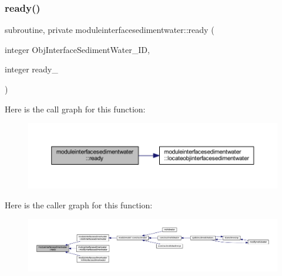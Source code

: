 \subsubsection{\texorpdfstring{ready()}{ready()}}
{\footnotesize\ttfamily subroutine, private moduleinterfacesedimentwater\+::ready (\begin{DoxyParamCaption}\item[{integer}]{Obj\+Interface\+Sediment\+Water\+\_\+\+ID,  }\item[{integer}]{ready\+\_\+ }\end{DoxyParamCaption})\hspace{0.3cm}{\ttfamily [private]}}

Here is the call graph for this function\+:\nopagebreak
\begin{figure}[H]
\begin{center}
\leavevmode
\includegraphics[width=350pt]{namespacemoduleinterfacesedimentwater_af31617d2ab88d4aceb9dd0edcac94ff2_cgraph}
\end{center}
\end{figure}
Here is the caller graph for this function\+:\nopagebreak
\begin{figure}[H]
\begin{center}
\leavevmode
\includegraphics[width=350pt]{namespacemoduleinterfacesedimentwater_af31617d2ab88d4aceb9dd0edcac94ff2_icgraph}
\end{center}
\end{figure}
\mbox{\label{namespacemoduleinterfacesedimentwater_ae241bc3d883ac6be0459ecc4b5128d68}} 

